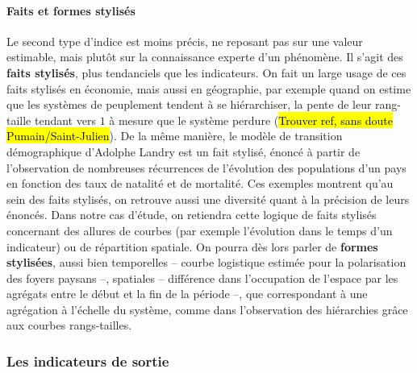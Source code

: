 \paragraph{Faits et formes stylisés}
Le second type d'indice est moins précis, ne reposant pas sur une valeur estimable, mais plutôt sur la connaissance experte d'un phénomène. Il s'agit des \og \textbf{faits stylisés}\fg{}\footnotemark{}, plus tendanciels que les indicateurs. On fait un large usage de ces faits stylisés en économie, mais aussi en géographie, par exemple quand on estime que les systèmes de peuplement tendent à se hiérarchiser, la pente de leur rang-taille tendant vers $1$ à mesure que le système perdure (\hl{Trouver ref, sans doute Pumain/Saint-Julien}). De la même manière, le modèle de transition démographique d'Adolphe Landry est un fait stylisé, énoncé à partir de l'observation de nombreuses récurrences de l'évolution des populations d'un pays en fonction des taux de natalité et de mortalité. Ces exemples montrent qu'au sein des faits stylisés, on retrouve aussi une diversité quant à la précision de leurs énoncés. Dans notre cas d'étude, on retiendra cette logique de faits stylisés concernant des allures de courbes (par exemple l'évolution dans le temps d'un indicateur) ou de répartition spatiale. On pourra dès lors parler de \og \textbf{formes stylisées}\fg{}, aussi bien temporelles -- courbe logistique estimée pour la polarisation des foyers paysans --, spatiales -- différence dans l'occupation de l'espace par les agrégats entre le début et la fin de la période --, que correspondant à une agrégation à l'échelle du système, comme dans l'observation des hiérarchies grâce aux courbes rangs-tailles.


\subsubsection{Les indicateurs de sortie}


